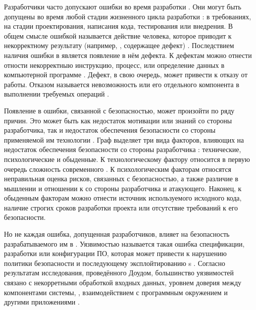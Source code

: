 %
Разработчики часто допускают ошибки во время разработки . 
%
Они могут быть допущены во время любой стадии жизненного цикла разработки : 
в требованиях, на стадии проектирования, написания кода, тестирования или внедрения. 
%
В общем смысле ошибкой называется действие человека, которое приводит к некорректному результату 
(например, , содержащее дефект) . 
%
Последствием наличия ошибки в  является появление в нём дефекта. 
%
К дефектам можно отнести отности некорректныю инструкцию, процесс, или определение данных 
в компьютерной программе . 
%
Дефект, в свою очередь, может привести к отказу  от работы. 
%
Отказом называется невозможность  или его отдельного компонента 
в выполнении требуемых операций .

%
Появление в  ошибки, связанной с безопасностью, может произойти по ряду 
причин. 
%
Это может быть как недостаток мотивации или знаний со стороны разработчика, так и 
недостаток обеспечения безопасности со стороны применяемой им технологии . 
%
Граф выделяет три вида факторов, влияющих на недостаток обеспечения безопасности со стороны 
разработчика : технические, психологические и обыденные. 
%
К технологическому фактору относится в первую очередь сложность современного 
. 
%
К психологическим факторам относятся неправильная оценка рисков, связанных с безопасностью, а также 
различие в мышлении и отношении к  со стороны разработчика и атакующего. 
%
Наконец, к обыденным факторам можно отнести источник используемого исходного кода, наличие строгих 
сроков разработки проекта или отсутствие требований к его безопасности.

%
Но не каждая ошибка, допущенная разработчиков, влияет на безопасность разрабатываемого им в 
. 
%
Уязвимостью называется такая ошибка спецификации, разработки или конфигурации ПО, которая может 
привести к нарушению политики безопасности и последующему эксплойтированию  s
   .
%
Согласно результатам исследования, проведённого Доудом, большинство уязвимостей связано с 
некорретными обработкой входных данных, уровнем доверия между компонентами системы, 
, взаимодействием с программным окружением и другими приложениями 
. 
